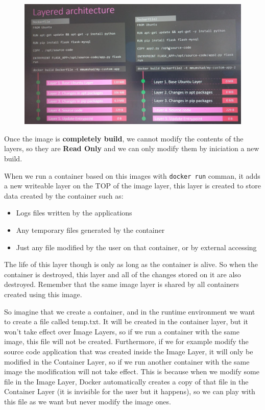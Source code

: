 \documentclass{article}
\newenvironment{blocktemplateII}[1]{%
    \tcolorbox[beamer,%
    noparskip,breakable,
    colframe=Green,%
    colbacklower=LimeGreen!75!LightGreen,%
    title=#1]}%
    {\endtcolorbox}
\begin{document}
\begin{figure}[H]
    \centering
    \includegraphics[width=\textwidth]{pictures/st2.png}
\end{figure}

\begin{blocktemplateII}{NOTE}
Once the image is \textbf{completely build}, we cannot modify the contents of the layers, so they are \textbf{Read Only} and we can only modify them by iniciation a new build.
\end{blocktemplateII}

When we run a container based on this images with \verb|docker run| comman, it adds a new writeable layer on the TOP of the image layer, this layer is created to store data created by the container such as:

\begin{itemize}
    \item Logs files written by the applications
    \item Any temporary files generated by the container
    \item Just any file modified by the user on that container, or by external accessing
\end{itemize}

The life of this layer though is only as long as the container is alive. So when the container is destroyed, this layer and all of the changes stored on it are also destroyed. Remember that the same image layer is shared by all containers created using this image.

So imagine that we create a container, and in the runtime environment we want to create a file called temp.txt. It will be created in the container layer, but it won't take effect over Image Layers, so if we run a container with the same image, this file will not be created. Furthermore, if we for example modify the source code application that was created inside the Image Layer, it will only be modified in the Container Layer, so if we run another container with the same image the modification will not take effect. This is because when we modify some file in the Image Layer, Docker automatically creates a copy of that file in the Container Layer (it is invisible for the user but it happens), so we can play with this file as we want but never modify the image ones.
\end{document}

